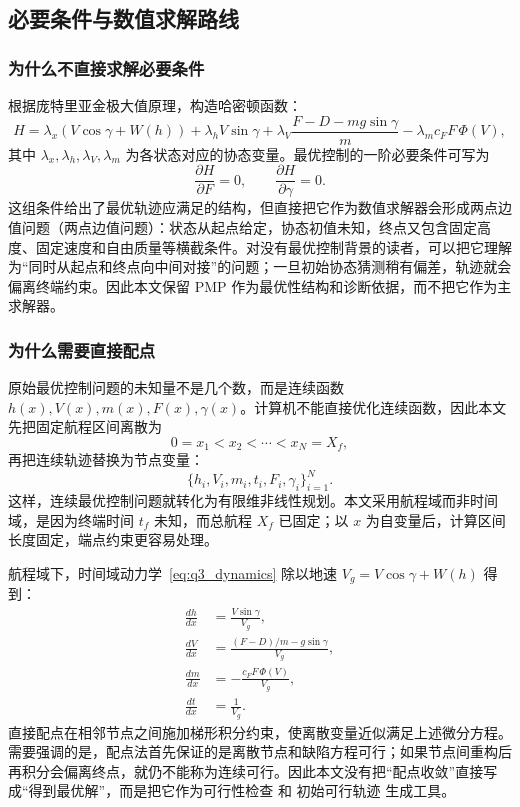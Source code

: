 \documentclass[withoutpreface,bwprint]{cumcmthesis}
\begin{document}
\subsection{必要条件与数值求解路线}

\subsubsection{为什么不直接求解必要条件}

根据庞特里亚金极大值原理\cite{pontryagin}，构造哈密顿函数：
\begin{equation}
H=\lambda_x(V\cos\gamma+W(h))+\lambda_hV\sin\gamma+\lambda_V\frac{F-D-mg\sin\gamma}{m}
-\lambda_m c_F F\,\Phi(V),
\label{eq:q3_hamiltonian}
\end{equation}
其中 $\lambda_x,\lambda_h,\lambda_V,\lambda_m$ 为各状态对应的协态变量。最优控制的一阶必要条件可写为
\begin{equation}
\frac{\partial H}{\partial F}=0,\qquad \frac{\partial H}{\partial \gamma}=0.
\end{equation}
这组条件给出了最优轨迹应满足的结构，但直接把它作为数值求解器会形成两点边值问题（两点边值问题）：状态从起点给定，协态初值未知，终点又包含固定高度、固定速度和自由质量等横截条件。对没有最优控制背景的读者，可以把它理解为“同时从起点和终点向中间对接”的问题；一旦初始协态猜测稍有偏差，轨迹就会偏离终端约束。因此本文保留 PMP 作为最优性结构和诊断依据，而不把它作为主求解器。

\subsubsection{为什么需要直接配点}

原始最优控制问题的未知量不是几个数，而是连续函数 $h(x),V(x),m(x),F(x),\gamma(x)$。计算机不能直接优化连续函数，因此本文先把固定航程区间离散为
\[
0=x_1<x_2<\cdots<x_N=X_f,
\]
再把连续轨迹替换为节点变量：
\[
\{h_i,V_i,m_i,t_i,F_i,\gamma_i\}_{i=1}^{N}.
\]
这样，连续最优控制问题就转化为有限维非线性规划。本文采用航程域而非时间域，是因为终端时间 $t_f$ 未知，而总航程 $X_f$ 已固定；以 $x$ 为自变量后，计算区间长度固定，端点约束更容易处理。

航程域下，时间域动力学~\eqref{eq:q3_dynamics} 除以地速 $V_g=V\cos\gamma+W(h)$ 得到：
\begin{align}
\frac{dh}{dx} &= \frac{V\sin\gamma}{V_g},\\
\frac{dV}{dx} &= \frac{(F-D)/m-g\sin\gamma}{V_g},\\
\frac{dm}{dx} &= -\frac{c_F F\,\Phi(V)}{V_g},\\
\frac{dt}{dx} &= \frac{1}{V_g}.
\end{align}
直接配点在相邻节点之间施加梯形积分约束，使离散变量近似满足上述微分方程。需要强调的是，配点法首先保证的是离散节点和缺陷方程可行；如果节点间重构后再积分会偏离终点，就仍不能称为连续可行。因此本文没有把“配点收敛”直接写成“得到最优解”，而是把它作为可行性检查 和 初始可行轨迹 生成工具。
\end{document}

